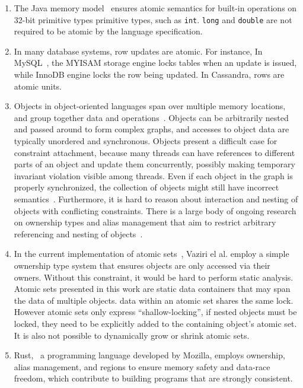 \documentclass[]{usiinfprospectus}
\begin{document}
\begin{enumerate}
	\itemsep0em 
	\item The Java memory model~\cite{javamemorymodel} ensures atomic semantics for built-in operations on 32-bit primitive types primitive types, such as \texttt{int}. \texttt{long} and \texttt{double} are not required to be atomic by the language specification.  
	
	\item In many database systems, row updates are atomic. For instance, In MySQL~\cite{mysql}, the MYISAM storage engine locks tables when an update is issued, while InnoDB engine locks the row being updated. In Cassandra, rows are atomic units. 
	
	\item Objects in object-oriented languages span over multiple memory locations, and group together data and operations~\cite{rentsch1982object}. Objects can be arbitrarily nested and passed around to form complex graphs, and accesses to object data are typically unordered and synchronous. Objects present a difficult case for constraint attachment, because many threads can have references to different parts of an object and update them concurrently, possibly making temporary invariant violation visible among threads. Even if each object in the graph is properly synchronized, the collection of objects might still have incorrect semantics~\cite{artho2003high}. Furthermore, it is hard to reason about interaction and nesting of objects with conflicting constraints. There is a large body of ongoing research on ownership types and alias management that aim to restrict arbitrary referencing and nesting of objects~\cite{muller1999universes, clarke2008minimal, haller2010capabilities}.
	
	\item In the current implementation of atomic sets~\cite{dolby2012data}, Vaziri el al. employ a simple ownership type system that ensures objects are only accessed via their owners. Without this constraint, it would be hard to perform static analysis. Atomic sets presented in this work are static data containers that may span the data of multiple objects. data within an atomic set shares the same lock. However atomic sets only express ``shallow-locking'', if nested objects must be locked, they need to be explicitly added to the containing object's atomic set. It is also not possible to dynamically grow or shrink atomic sets. 
	
	\item Rust,~\cite{rust} a programming language developed by Mozilla, employs ownership, alias management, and regions to ensure memory safety and data-race freedom, which contribute to building programs that are strongly consistent. 
	

\end{enumerate}
\end{document}
